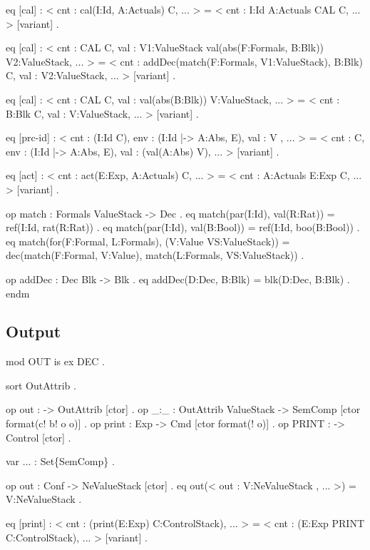 \documentclass{llncs}%
\begin{document}
    eq [cal] :
        < cnt : cal(I:Id, A:Actuals) C, ... > =
        < cnt : I:Id A:Actuals CAL C, ... > [variant] .

    eq [cal] :
        < cnt : CAL C,
          val : V1:ValueStack
          val(abs(F:Formals, B:Blk)) V2:ValueStack, ... > =
        < cnt : addDec(match(F:Formals, V1:ValueStack), B:Blk) C,
          val : V2:ValueStack, ... > [variant] .

    eq [cal] :
        < cnt : CAL C,
          val : val(abs(B:Blk)) V:ValueStack, ... > =
        < cnt : B:Blk C,
          val : V:ValueStack, ... > [variant] .

    eq [prc-id] :
        < cnt : (I:Id C),
          env : (I:Id |-> A:Abs, E),
          val : V , ... > =
        < cnt : C,
          env : (I:Id |-> A:Abs, E),
          val : (val(A:Abs) V), ... > [variant] .

    eq [act] :
        < cnt : act(E:Exp, A:Actuals) C, ... > =
        < cnt : A:Actuals E:Exp C, ... > [variant] .

    op match : Formals ValueStack -> Dec .
    eq match(par(I:Id), val(R:Rat)) = ref(I:Id, rat(R:Rat)) .
    eq match(par(I:Id), val(B:Bool)) = ref(I:Id, boo(B:Bool)) .
    eq match(for(F:Formal, L:Formals), (V:Value VS:ValueStack)) =
        dec(match(F:Formal, V:Value),
          match(L:Formals, VS:ValueStack)) .

    op addDec : Dec Blk -> Blk .
    eq addDec(D:Dec, B:Blk) = blk(D:Dec, B:Blk) .
endm
\nwendcode{}\nwdocspar

\subsection{Output}
\nwenddocs{}\endmoddef\nwstartdeflinemarkup\nwenddeflinemarkup
mod OUT is
    ex DEC .

    sort OutAttrib .

    op out : -> OutAttrib [ctor] .
    op _:_ : OutAttrib ValueStack -> SemComp [ctor format(c! b! o o)] .
    op print : Exp -> Cmd [ctor format(! o)] .
    op PRINT : -> Control [ctor] .

    var ... : Set\{SemComp\} .

    op out : Conf -> NeValueStack [ctor] .
    eq out(< out : V:NeValueStack , ... >) = V:NeValueStack .

    eq [print] :
        < cnt : (print(E:Exp) C:ControlStack), ... > =
        < cnt : (E:Exp PRINT C:ControlStack), ... > [variant] .
\end{document}

